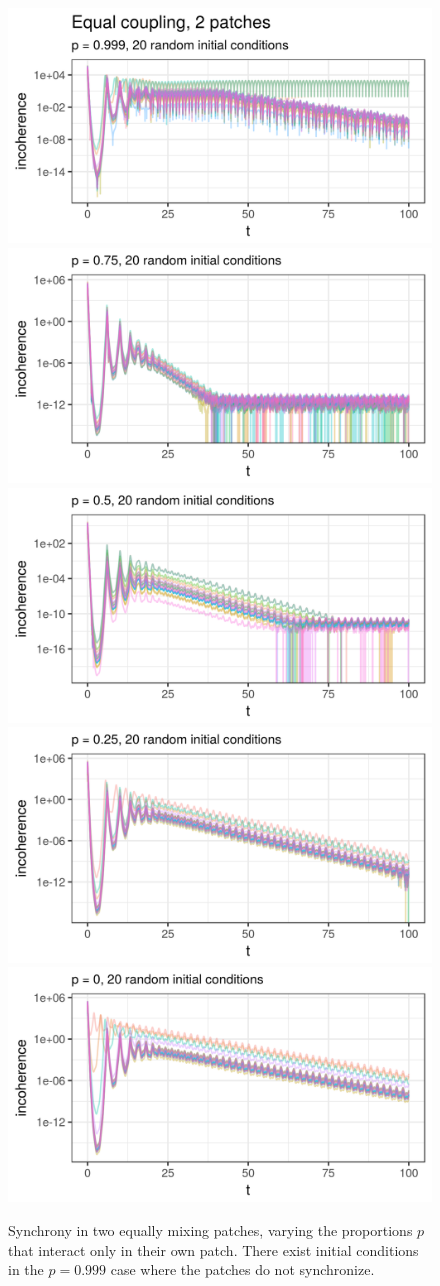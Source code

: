 \documentclass[12pt]{article}
\begin{document}
\begin{figure}
\centering
\subfloat
{\includegraphics[width=.6\linewidth]{mixfig/eq99.png}} \\
\subfloat
{\includegraphics[width=.45\linewidth]{mixfig/eq75.png}} \quad
\subfloat
{\includegraphics[width=.45\linewidth]{mixfig/eq50.png}} \\
\subfloat
{\includegraphics[width=.45\linewidth]{mixfig/eq25.png}} \quad
\subfloat
{\includegraphics[width=.45\linewidth]{mixfig/eq0.png}} \\
\caption{Synchrony in two equally mixing patches, varying the proportions $p$ that interact only in their own patch. There exist initial conditions in the $p = 0.999$ case where the patches do not synchronize.} \label{fig:mix}
\end{figure}
\end{document}
